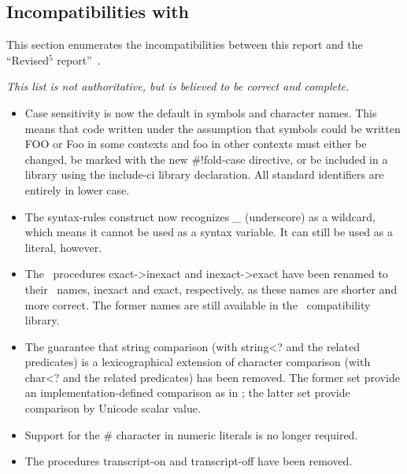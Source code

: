 

\subsection*{Incompatibilities with \rfivers}
\label{incompatibilities}

This section enumerates the incompatibilities between this report and
the ``Revised$^5$ report''~\cite{R5RS}.

{\em This list is not authoritative, but is believed to be correct and complete.}


\begin{itemize}

\item Case sensitivity is now the default in symbols and character names.
This means that code written under the assumption that symbols could be
written {\cf FOO} or {\cf Foo} in some contexts and {\cf foo} in other contexts
must either be changed, be marked with the new {\cf \#!fold-case} directive,
or be included in a library using the {\cf include-ci} library declaration.
All standard identifiers are entirely in lower case.

\item The {\cf syntax-rules} construct now recognizes {\em \_} (underscore) 
as a wildcard, which means it cannot be used as a syntax variable.
It can still be used as a literal, however.

\item The \rfivers\ procedures {\cf exact->inexact} and {\cf inexact->exact}
have been renamed to their \rsixrs\ names, {\cf inexact} and {\cf exact},
respectively, as these names are shorter and more correct.
The former names are still available in the \rfivers\ compatibility library.

\item The guarantee that string comparison (with {\cf string<?} and the
related predicates) is a lexicographical extension of character comparison
(with {\cf char<?} and the related predicates) has been removed.  The former
set provide an implementation-defined comparison as in \rfivers; the latter
set provide comparison by Unicode scalar value.

\item Support for the \# character in numeric literals is no longer required.

\item The procedures {\cf transcript-on} and {\cf transcript-off} have been removed.

\end{itemize}

